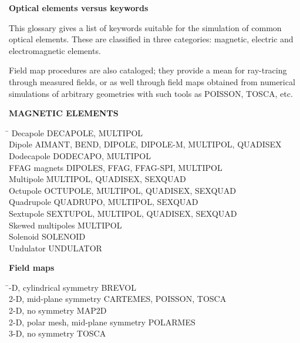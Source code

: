 
\centerline{\Large\textbf{Optical elements versus keywords}}
\bigskip


This glossary gives a list of keywords suitable for the 
simulation of  common optical elements. These are classified in 
three categories: magnetic, electric and electromagnetic elements.

Field map procedures are also cataloged; they provide a mean for ray-tracing through 
measured fields, or as well through field maps obtained from numerical simulations of 
arbitrary geometries with such tools as POISSON, TOSCA, etc.

\bigskip


\noindent\textbf{MAGNETIC ELEMENTS} 
\smallskip

\begin{tabbing}
\hspace*{7cm} \= \kill
  Decapole          \> DECAPOLE, MULTIPOL \\
  Dipole            \> AIMANT, BEND, DIPOLE, DIPOLE-M, MULTIPOL, QUADISEX \\
  Dodecapole        \> DODECAPO, MULTIPOL \\
  FFAG magnets      \> DIPOLES, FFAG, FFAG-SPI, MULTIPOL \\
  Multipole         \> MULTIPOL, QUADISEX, SEXQUAD \\
  Octupole          \> OCTUPOLE, MULTIPOL, QUADISEX, SEXQUAD \\
  Quadrupole        \> QUADRUPO, MULTIPOL, SEXQUAD \\
  Sextupole         \> SEXTUPOL, MULTIPOL, QUADISEX, SEXQUAD \\
  Skewed multipoles \> MULTIPOL \\
  Solenoid          \> SOLENOID  \\
  Undulator         \> UNDULATOR 
\end{tabbing}
\bigskip

\noindent\textbf{Field maps}  
\smallskip

\begin{tabbing}
\hspace*{7cm} \= -D, cylindrical symmetry \> BREVOL \\
  2-D, mid-plane symmetry   \> CARTEMES, POISSON, TOSCA \\
  2-D, no symmetry          \> MAP2D \\
  2-D, polar mesh, mid-plane symmetry          \> POLARMES \\
  3-D, no symmetry          \> TOSCA
\end{tabbing}
\bigskip

